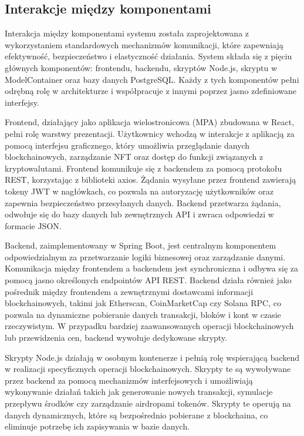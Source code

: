\subsection{Interakcje między komponentami}
Interakcja między komponentami systemu została zaprojektowana z wykorzystaniem standardowych mechanizmów komunikacji, które zapewniają efektywność, bezpieczeństwo i elastyczność działania. System składa się z pięciu głównych komponentów: frontendu, backendu, skryptów Node.js, skryptu w ModelContainer oraz bazy danych PostgreSQL. Każdy z tych komponentów pełni odrębną rolę w architekturze i współpracuje z innymi poprzez jasno zdefiniowane interfejsy.

Frontend, działający jako aplikacja wielostronicowa (MPA) zbudowana w React, pełni rolę warstwy prezentacji. Użytkownicy wchodzą w interakcje z aplikacją za pomocą interfejsu graficznego, który umożliwia przeglądanie danych blockchainowych, zarządzanie NFT oraz dostęp do funkcji związanych z kryptowalutami. Frontend komunikuje się z backendem za pomocą protokołu REST, korzystając z biblioteki axios. Żądania wysyłane przez frontend zawierają tokeny JWT w nagłówkach, co pozwala na autoryzację użytkowników oraz zapewnia bezpieczeństwo przesyłanych danych. Backend przetwarza żądania, odwołuje się do bazy danych lub zewnętrznych API i zwraca odpowiedzi w formacie JSON.

Backend, zaimplementowany w Spring Boot, jest centralnym komponentem odpowiedzialnym za przetwarzanie logiki biznesowej oraz zarządzanie danymi. Komunikacja między frontendem a backendem jest synchroniczna i odbywa się za pomocą jasno określonych endpointów API REST. Backend działa również jako pośrednik między frontendem a zewnętrznymi dostawcami informacji blockchainowych, takimi jak Etherscan, CoinMarketCap czy Solana RPC, co pozwala na dynamiczne pobieranie danych transakcji, bloków i kont w czasie rzeczywistym. W przypadku bardziej zaawansowanych operacji blockchainowych lub przewidzenia cen, backend wywołuje dedykowane skrypty.

Skrypty Node.js działają w osobnym kontenerze i pełnią rolę wspierającą backend w realizacji specyficznych operacji blockchainowych. Skrypty te są wywoływane przez backend za pomocą mechanizmów interfejsowych i umożliwiają wykonywanie działań takich jak generowanie nowych transakcji, symulacje przepływu środków czy zarządzanie airdropami tokenów. Skrypty te operują na danych dynamicznych, które są bezpośrednio pobierane z blockchaina, co eliminuje potrzebę ich zapisywania w bazie danych.

